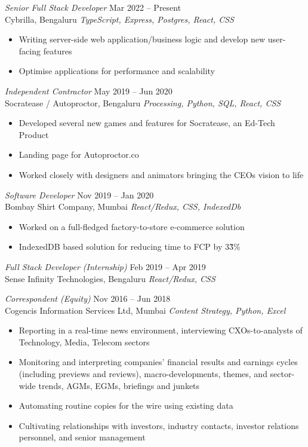 \documentclass[margin, 10pt]{res} %
\begin{document}
\begin{resume}
{\sl Senior Full Stack Developer} \hfill Mar 2022 – \color{RubineRed} Present \color{Black} \\
Cybrilla, Bengaluru \hfill {\scriptsize \it TypeScript, Express, Postgres, React, CSS}
\begin{itemize}
\item Writing server-side web application/business logic and develop new user-facing features
\item Optimise applications for performance and scalability
\end{itemize}

{\sl Independent Contractor} \hfill May 2019 – Jun 2020 \\
Socratease / Autoproctor, Bengaluru \hfill {\scriptsize \it Processing, Python, SQL, React, CSS}
\begin{itemize}
\item Developed several new games and features for Socratease, an Ed-Tech Product
\item Landing page for Autoproctor.co
\item Worked closely with designers and animators bringing the CEOs vision to life 
\end{itemize}

{\sl Software Developer} \hfill Nov 2019 – Jan 2020 \\
Bombay Shirt Company, Mumbai \hfill {\scriptsize \it React/Redux, CSS, IndexedDb}
\begin{itemize}
\item Worked on a full-fledged factory-to-store e-commerce solution
\item IndexedDB based solution for reducing time to FCP by 3\~3\%
\end{itemize}
{\sl Full Stack Developer (Internship)} \hfill Feb 2019 – Apr 2019 \\
Sense Infinity Technologies, Bengaluru \hfill {\scriptsize \it React/Redux, CSS}

{\sl Correspondent (Equity)} \hfill Nov 2016 – Jun 2018 \\
Cogencis Information Services Ltd, Mumbai \hfill {\scriptsize \it Content Strategy, Python, Excel}
\begin{itemize}
\item Reporting in a real-time news environment, interviewing CXOs-to-analysts of Technology, Media, Telecom sectors
\item Monitoring and interpreting companies’ financial results and earnings cycles (including previews and reviews), macro-developments, themes, and sector-wide trends, AGMs, EGMs, briefings and junkets
\item Automating routine copies for the wire using existing data
\item Cultivating relationships with investors, industry contacts, investor relations personnel, and senior management


\end{itemize}
\end{resume}
\end{document}

